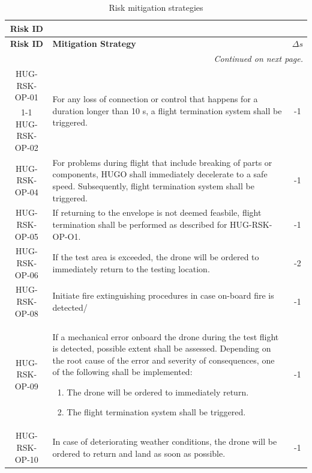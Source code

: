 \begin{longtable}{|c|p{12cm}|c|}
\caption{Risk mitigation strategies}
\label{tab:risk_mitigation_scenarios} \\

\hline
\textbf{Risk ID} & \centering{\textbf{Mitigation Strategy}} & \centering{\textbf{$\Delta s$}} \tabularnewline
\hline\hline
\endfirsthead

\hline
\textbf{Risk ID} & \centering\textbf{Mitigation Strategy} & \textbf{$\Delta s$} \\
\hline\hline
\endhead

\hline
\multicolumn{3}{r}{\textit{Continued on next page.}} \\
\endfoot

\hline
\endlastfoot

 HUG-RSK-OP-01 & \multirow{2}{*}{\parbox{11cm}{For any loss of connection or control that happens for a duration longer than 10 s, a flight termination system shall be triggered.}} & \multirow{2}{*}{-1} \\ 
        \cline{1-1}
        HUG-RSK-OP-02 & & \\ 
        \hline
        HUG-RSK-OP-04 & For problems during flight that include breaking of parts or components, HUGO shall immediately decelerate to a safe speed. Subsequently, flight termination system shall be triggered. & -1 \\ 
        \hline
        HUG-RSK-OP-05 & If returning to the envelope is not deemed feasbile, flight termination shall be performed as described for HUG-RSK-OP-O1. & -1 \\\hline
        HUG-RSK-OP-06 & If the test area is exceeded, the drone will be ordered to immediately return to the testing location. & -2 \\ \hline
        HUG-RSK-OP-08 & Initiate fire extinguishing procedures in case on-board fire is detected/ & -1 \\\hline
        HUG-RSK-OP-09 & If a mechanical error onboard the drone during the test flight is detected, possible extent shall be assessed. Depending on the root cause of the error and severity of consequences, one of the following shall be implemented:
        \begin{enumerate}
        \item The drone will be ordered to immediately return. 
        \item The flight termination system shall be triggered. 
        \end{enumerate} 
        & -1 \\ \hline
        HUG-RSK-OP-10 & In case of deteriorating weather conditions, the drone will be ordered to return and land as soon as possible. & -1 \\ \hline
        

\end{longtable}
